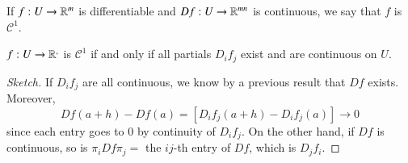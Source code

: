 \begin{defn}
    If $f:U\rightarrow \mathbb R^m$ is differentiable and $Df:U\rightarrow \mathbb R^{mn}$ is continuous, we say that $f$ is $\mathcal{C}^1$.
\end{defn}

\begin{lem}
    $f:U\rightarrow \mathbb R^,$ is $\mathcal{C}^1$ if and only if all partials $D_if_j$ exist and are continuous on $U$.
\end{lem}
\begin{proof}[Sketch]
    If $D_if_j$ are all continuous, we know by a previous result that $Df$ exists. Moreover, $$Df(a+h) - Df(a) = [D_if_j(a+h)-D_if_j(a)]\rightarrow 0$$ since each entry goes to $0$ by continuity of $D_if_j$. On the other hand, if $Df$ is continuous, so is $\pi_iDf\pi_j = $ the $ij$-th entry of $Df$, which is $D_jf_i$.
\end{proof}

